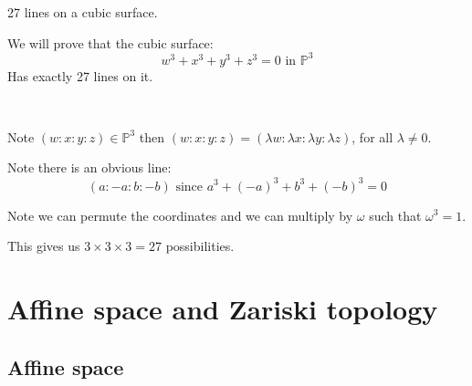 \begin{example}
    27 lines on a cubic surface.

We will prove that the cubic surface:\begin{equation*}
    w^3+x^3+y^3+z^3 = 0 \text{ in }\mathbb{P}^3
\end{equation*}
Has exactly 27 lines on it.

\

Note $(w\colon x\colon y\colon z)\in \mathbb{P}^3$ then $(w\colon x\colon y\colon z) = (\lambda w\colon \lambda x\colon \lambda y\colon \lambda z)$, for all $\lambda\neq 0$.


Note there is an obvious line:\begin{equation*}
    (a\colon -a \colon b \colon -b) \text{ since }a^3+(-a)^3+b^3+(-b)^3 = 0
\end{equation*}

Note we can permute the coordinates and we can multiply by $\omega$ such that $\omega^3 = 1$.

This gives us $3\times 3 \times 3 = 27$ possibilities.

\end{example} 

\lecture{}
\section{Affine space and Zariski topology}

\subsection{Affine space}

